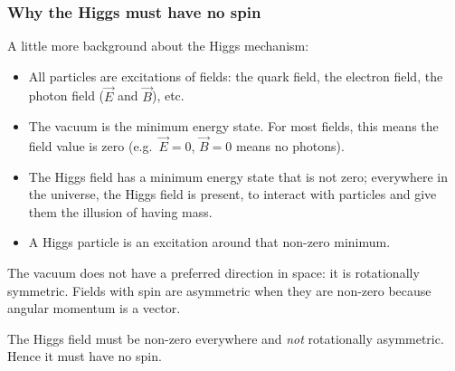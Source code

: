 \documentclass[compress]{beamer}
\newcommand{\isnote}{}
\begin{document}
\setbeamertemplate{headline}{\mbox{ } \hfill
\begin{minipage}{5.5 cm}
\vspace{-0.75 cm} \small
\end{minipage} \hfill
\begin{minipage}{4.5 cm}
\vspace{-0.75 cm} \small
\begin{flushright}
\ifthenelse{\equal{\insertpagenumber}{1}}{}{Jim Pivarski \hspace{0.2 cm} \insertpagenumber\isnote/\pageref{numpages}}
\end{flushright}
\end{minipage}\mbox{\hspace{0.2 cm}} \hspace{0.01 cm} \vspace{-1.05 cm}}

\begin{frame}
\frametitle{Why the Higgs must have no spin}

A little more background about the Higgs mechanism:
\begin{itemize}
\item All particles are excitations of fields: the quark field, the electron field, the photon field ($\vec{E}$ and $\vec{B}$), etc.
\item The vacuum is the minimum energy state.  For most fields, this means the field value is zero (e.g.\ $\vec{E}=0$, $\vec{B}=0$ means no photons).
\item The Higgs field has a minimum energy state that is not zero; everywhere in the universe, the Higgs field is present, to interact with particles and give them the illusion of having mass.
\item A Higgs particle is an excitation around that non-zero minimum.
\end{itemize}

The vacuum does not have a preferred direction in space: it is rotationally symmetric.  Fields with spin are asymmetric when they are non-zero because angular momentum is a vector.

\vfill
The Higgs field must be non-zero everywhere and {\it not} rotationally asymmetric.  Hence it must have no spin.

\end{frame}
\end{document}
